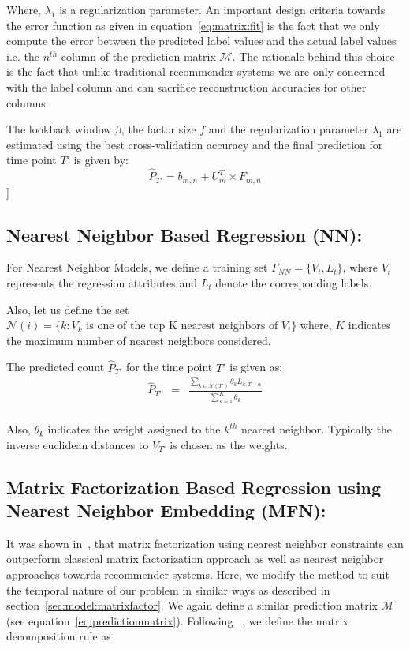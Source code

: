 Where, $\lambda_1$ is a regularization parameter. An important design criteria towards
the error function as given in equation~\ref{eq:matrix:fit} is the fact that we only compute the error
between the predicted label values and the actual label values i.e. the $n^{th}$ column of the prediction 
matrix $\mathcal{M}$. The rationale behind this choice is the fact that unlike traditional recommender 
systems we are only concerned with the label column and can sacrifice reconstruction accuracies for other 
columns. 

The lookback window $\beta$, the factor size $f$ and the regularization parameter $\lambda_1$ 
are estimated using the best cross-validation accuracy 
and the final prediction for time point $T'$ is given by:
\[\widehat{P}_{T'} = b_{m,n} + U_m^T \times F_{m,n} \]]

\subsection{\label{sec:model:nearestneighbor} Nearest Neighbor Based Regression (NN):}
For Nearest Neighbor Models, we define a training set $\Gamma_{NN}
= \lbrace V_t, L_t \rbrace$, where $V_t$ represents the regression attributes
and $L_t$ denote the corresponding labels.

Also, let us define the set 
$\mathcal{N}(i) = \lbrace k : \mbox{$V_k$ is one of the top  K nearest neighbors of $V_{i}$} \rbrace$ 
where, $K$ indicates the maximum number of nearest neighbors considered.


The predicted count $\widehat{P}_{T'}$ for the time point $T'$ is given as:
\begin{equation} \label{eq:nearestneighbor:pred}
  \begin{array}{lcl}
    \widehat{P}_{T'} & = & \frac{\sum\limits_{k \in \mathcal{N}(T')} \theta_{k}L_{k,T - \alpha}}
    {\sum\limits_{k=1}^{K} \theta_{k}}\\
  \end{array}
\end{equation}

Also, $\theta_k$ indicates the weight assigned to the $k^{th}$ nearest neighbor.
Typically the inverse euclidean distances to $V_{T'}$ is chosen as the weights.

\subsection{\label{sec:model:nearestmatrix} Matrix Factorization Based
Regression using Nearest Neighbor Embedding (MFN):}
It was shown in~\cite{koren2008factor},  that matrix factorization using nearest neighbor constraints can
outperform classical matrix factorization approach as well as nearest neighbor approaches towards
recommender systems. Here, we modify the method to suit the temporal nature of our problem in similar ways 
as described in section~\ref{sec:model:matrixfactor}. We again define a similar prediction matrix $\mathcal{M}$ 
(see equation~\ref{eq:predictionmatrix}). Following ~\cite{koren2008factor}, we define the 
matrix decomposition rule as 

